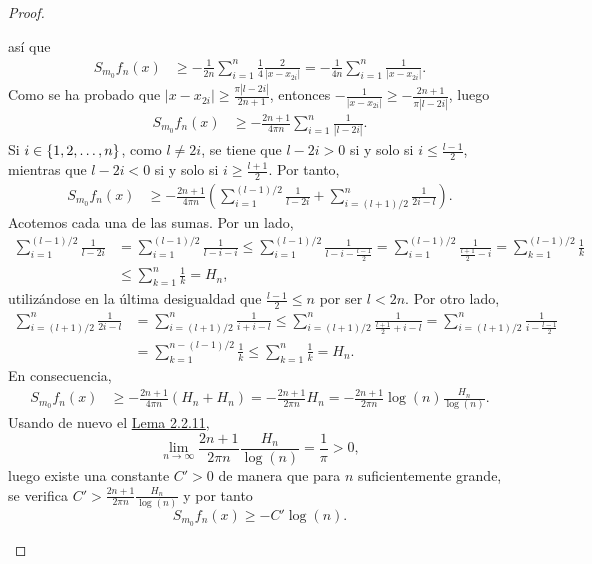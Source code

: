 \documentclass[a4paper, 12pt, oneside]{book}
\begin{document}
\begin{proof}
\begin{itemize}
        así que
        \begin{align*}
            S_{m_0}f_n(x) &\geq -\frac{1}{2n}\sum_{i=1}^n \frac{1}{4}\frac{2}{|x-x_{2i}|} = -\frac{1}{4n}\sum_{i=1}^n \frac{1}{|x-x_{2i}|}.
        \end{align*}
        Como se ha probado que $|x-x_{2i}| \geq \frac{\pi |l -2i|}{2n+1}$, entonces $-\frac{1}{|x-x_{2i}|} \geq -\frac{2n+1}{\pi|l-2i|}$, luego
        \begin{align*}
            S_{m_0}f_n(x) &\geq -\frac{2n+1}{4\pi n}\sum_{i=1}^n \frac{1}{|l-2i|}.
        \end{align*}
        Si $i \in \{1,2,\mathellipsis,n\}$, como $l \neq 2i$, se tiene que $l - 2i > 0$ si y solo si $i \leq \frac{l-1}{2}$, mientras que $l - 2i < 0$ si y solo si $i \geq \frac{l+1}{2}$. Por tanto,
        \begin{align*}
            S_{m_0}f_n(x) &\geq -\frac{2n+1}{4\pi n}\left(\sum_{i=1}^{(l-1)/2} \frac{1}{l-2i} +\sum_{i=(l+1)/2}^n \frac{1}{2i-l}\right).
        \end{align*}
        Acotemos cada una de las sumas. Por un lado,
        \begin{align*}
            \sum_{i=1}^{(l-1)/2}\frac{1}{l-2i} &= \sum_{i=1}^{(l-1)/2} \frac{1}{l-i-i} \leq \sum_{i=1}^{(l-1)/2} \frac{1}{l-i-\frac{l-1}{2}} = \sum_{i=1}^{(l-1)/2} \frac{1}{\frac{l+1}{2}-i} = \sum_{k=1}^{(l-1)/2} \frac{1}{k} \\ &\leq \sum_{k=1}^{n}\frac{1}{k} = H_n,
        \end{align*}
        utilizándose en la última desigualdad que $\frac{l-1}{2} \leq n$ por ser $l < 2n$. Por otro lado,
        \begin{align*}
            \sum_{i=(l+1)/2}^n \frac{1}{2i-l} &= \sum_{i=(l+1)/2}^n \frac{1}{i+i-l} \leq \sum_{i=(l+1)/2}^n \frac{1}{\frac{l+1}{2}+i-l} = \sum_{i=(l+1)/2}^n \frac{1}{i-\frac{l-1}{2}} \\ &= \sum_{k=1}^{n-(l-1)/2}\frac{1}{k} \leq \sum_{k=1}^n \frac{1}{k} = H_n.
        \end{align*}
        En consecuencia,
        \begin{align*}
            S_{m_0}f_n(x) &\geq -\frac{2n+1}{4\pi n}(H_n+H_n) = -\frac{2n+1}{2\pi n}H_n =-\frac{2n+1}{2\pi n}\log(n)\frac{H_n}{\log(n)} .
        \end{align*}
        Usando de nuevo el \hyperref[2.2.11]{\color{blue}Lema 2.2.11},
        \[\lim_{n\to\infty} \frac{2n+1}{2\pi n}\frac{H_n}{\log(n)} = \frac{1}{\pi} > 0,\]
        luego existe una constante $C'>0$ de manera que para $n$ suficientemente grande, se verifica $C' > \frac{2n+1}{2\pi n}\frac{H_n}{\log(n)}$ y por tanto
        \[S_{m_0}f_n(x) \geq -C'\log(n).\]
    

\end{itemize}
\end{proof}
\end{document}

